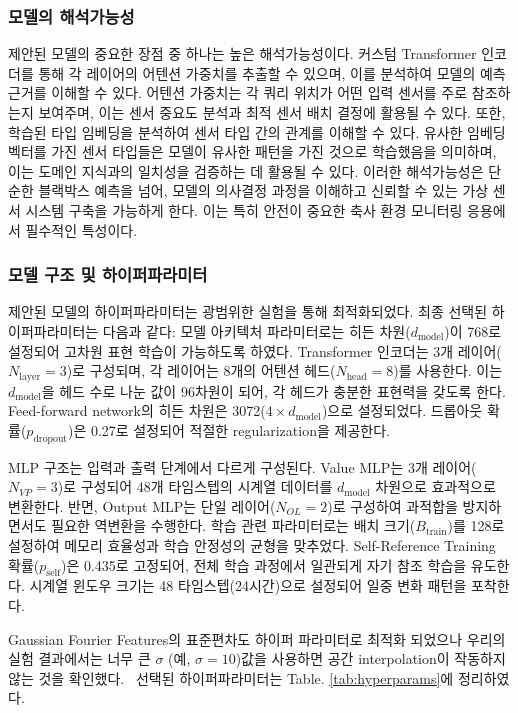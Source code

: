 \documentclass[final,5p,times,twocolumn,authoryear]{elsarticle}
\begin{document}
\subsubsection{모델의 해석가능성}
제안된 모델의 중요한 장점 중 하나는 높은 해석가능성이다. 커스텀 Transformer 인코더를 통해 각 레이어의 어텐션 가중치를 추출할 수 있으며, 이를 분석하여 모델의 예측 근거를 이해할 수 있다. 어텐션 가중치는 각 쿼리 위치가 어떤 입력 센서를 주로 참조하는지 보여주며, 이는 센서 중요도 분석과 최적 센서 배치 결정에 활용될 수 있다.
또한, 학습된 타입 임베딩을 분석하여 센서 타입 간의 관계를 이해할 수 있다. 유사한 임베딩 벡터를 가진 센서 타입들은 모델이 유사한 패턴을 가진 것으로 학습했음을 의미하며, 이는 도메인 지식과의 일치성을 검증하는 데 활용될 수 있다.
이러한 해석가능성은 단순한 블랙박스 예측을 넘어, 모델의 의사결정 과정을 이해하고 신뢰할 수 있는 가상 센서 시스템 구축을 가능하게 한다. 이는 특히 안전이 중요한 축사 환경 모니터링 응용에서 필수적인 특성이다.

\subsubsection{모델 구조 및 하이퍼파라미터}

제안된 모델의 하이퍼파라미터는 광범위한 실험을 통해 최적화되었다. 최종 선택된 하이퍼파라미터는 다음과 같다:
모델 아키텍처 파라미터로는 히든 차원($d_{\text{model}}$)이 768로 설정되어 고차원 표현 학습이 가능하도록 하였다. Transformer 인코더는 3개 레이어($N_{\text{layer}}=3$)로 구성되며, 각 레이어는 8개의 어텐션 헤드($N_{\text{head}}=8$)를 사용한다. 이는 $d_{\text{model}}$을 헤드 수로 나눈 값이 96차원이 되어, 각 헤드가 충분한 표현력을 갖도록 한다. Feed-forward network의 히든 차원은 3072($4 \times d_{\text{model}}$)으로 설정되었다. 드롭아웃 확률($p_{\text{dropout}}$)은 0.27로 설정되어 적절한 regularization을 제공한다.


MLP 구조는 입력과 출력 단계에서 다르게 구성된다. Value MLP는 3개 레이어($N_{VP}=3$)로 구성되어 48개 타임스텝의 시계열 데이터를 $d_{\text{model}}$ 차원으로 효과적으로 변환한다. 반면, Output MLP는 단일 레이어($N_{OL}=2$)로 구성하여 과적합을 방지하면서도 필요한 역변환을 수행한다.
학습 관련 파라미터로는 배치 크기($B_{\text{train}}$)를 128로 설정하여 메모리 효율성과 학습 안정성의 균형을 맞추었다. Self-Reference Training 확률($p_{\text{self}}$)은 0.435로 고정되어, 전체 학습 과정에서 일관되게 자기 참조 학습을 유도한다. 시계열 윈도우 크기는 48 타임스텝(24시간)으로 설정되어 일중 변화 패턴을 포착한다.

Gaussian Fourier Features의 표준편차도 하이퍼 파라미터로 최적화 되었으나 우리의 실험 결과에서는 너무 큰 $\sigma$ (예, $\sigma=10$)값을 사용하면 공간 interpolation이 작동하지 않는 것을 확인했다.  선택된 하이퍼파라미터는 Table. \ref{tab:hyperparams}에 정리하였다.
\end{document}
